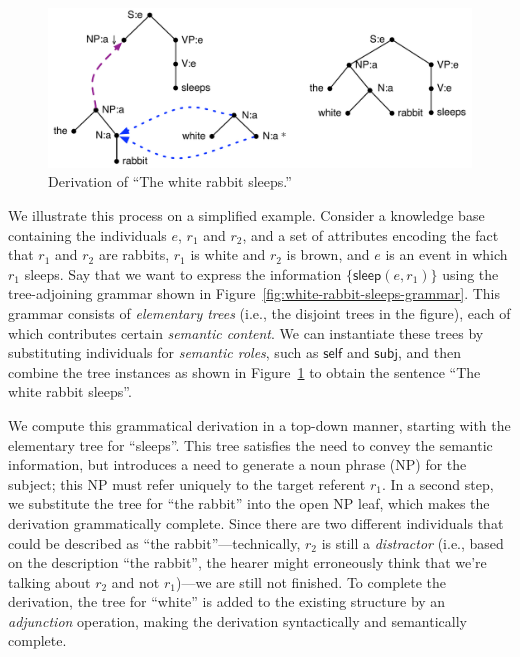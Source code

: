 \begin{figure}
  \centering
  \includegraphics[width=\columnwidth]{pic-derivation}
  \caption{Derivation of ``The white rabbit sleeps.''}
  \label{fig:white-rabbit-sleeps-deriv}
\end{figure}


We illustrate this process on a simplified example.  Consider a
knowledge base containing the individuals $e$, $r_1$ and $r_2$, and a
set of attributes encoding the fact that $r_1$ and $r_2$ are rabbits,
$r_1$ is white and $r_2$ is brown, and $e$ is an event in which $r_1$
sleeps.  Say that we want to express the information
$\{\mathsf{sleep}(e,r_1)\}$ using the tree-adjoining grammar shown in
Figure~\ref{fig:white-rabbit-sleeps-grammar}. This grammar consists of
\emph{elementary trees} (i.e., the disjoint trees in the figure), each
of which contributes certain \emph{semantic content}. We can
instantiate these trees by substituting individuals for \emph{semantic
  roles}, such as $\mathsf{self}$ and $\mathsf{subj}$, and then
combine the tree instances as shown in
Figure~\ref{fig:white-rabbit-sleeps-deriv} to obtain the sentence
``The white rabbit sleeps''.

We compute this grammatical derivation in a top-down manner, starting with
the elementary tree for ``sleeps''. This tree satisfies the need to convey
the semantic information, but introduces a need to generate a noun phrase
(NP) for the subject; this NP must refer uniquely to the target referent
$r_1$. In a second step, we substitute the tree for ``the rabbit'' into the
open NP leaf, which makes the derivation grammatically complete. Since
there are two different individuals that could be described as ``the
rabbit''---technically, $r_2$ is still a \emph{distractor} (i.e., based on
the description ``the rabbit'', the hearer might erroneously think that
we're talking about $r_2$ and not $r_1$)---we are still not finished. To
complete the derivation, the tree for ``white'' is added to the existing
structure by an \emph{adjunction} operation, making the derivation
syntactically and semantically complete.


